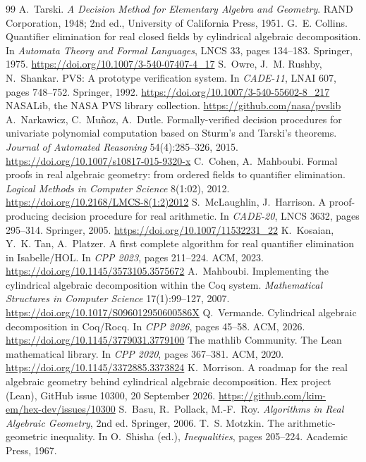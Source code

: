 \documentclass[11pt]{article}
\begin{document}
\begin{thebibliography}{99}\footnotesize
\setlength\itemsep{1pt}
 A.~Tarski. \emph{A Decision Method for Elementary Algebra and Geometry}. RAND Corporation, 1948;
  2nd ed., University of California Press, 1951.
 G.~E. Collins. Quantifier elimination for real closed fields by cylindrical algebraic
  decomposition. In \emph{Automata Theory and Formal Languages}, LNCS 33, pages 134--183. Springer, 1975.
  \url{https://doi.org/10.1007/3-540-07407-4_17}
 S.~Owre, J.~M. Rushby, N.~Shankar. PVS: A prototype verification system. In \emph{CADE-11},
  LNAI 607, pages 748--752. Springer, 1992. \url{https://doi.org/10.1007/3-540-55602-8_217}
 NASALib, the NASA PVS library collection. \url{https://github.com/nasa/pvslib}
 A.~Narkawicz, C.~Mu\~noz, A.~Dutle. Formally-verified decision procedures for univariate
  polynomial computation based on Sturm's and Tarski's theorems. \emph{Journal of Automated Reasoning}
  54(4):285--326, 2015. \url{https://doi.org/10.1007/s10817-015-9320-x}
 C.~Cohen, A.~Mahboubi. Formal proofs in real algebraic geometry: from ordered fields to
  quantifier elimination. \emph{Logical Methods in Computer Science} 8(1:02), 2012. \url{https://doi.org/10.2168/LMCS-8(1:2)2012}
 S.~McLaughlin, J.~Harrison. A proof-producing decision procedure for real arithmetic. In
  \emph{CADE-20}, LNCS 3632, pages 295--314. Springer, 2005. \url{https://doi.org/10.1007/11532231_22}
 K.~Kosaian, Y.~K. Tan, A.~Platzer. A first complete algorithm for real quantifier
  elimination in Isabelle/HOL. In \emph{CPP 2023}, pages 211--224. ACM, 2023. \url{https://doi.org/10.1145/3573105.3575672}
 A.~Mahboubi. Implementing the cylindrical algebraic decomposition within the Coq system.
  \emph{Mathematical Structures in Computer Science} 17(1):99--127, 2007.
  \url{https://doi.org/10.1017/S096012950600586X}
 Q.~Vermande. Cylindrical algebraic decomposition in Coq/Rocq. In \emph{CPP 2026},
  pages 45--58. ACM, 2026. \url{https://doi.org/10.1145/3779031.3779100}
 The mathlib Community. The Lean mathematical library. In \emph{CPP 2020}, pages 367--381. ACM, 2020.
  \url{https://doi.org/10.1145/3372885.3373824}
 K.~Morrison. A roadmap for the real algebraic geometry behind cylindrical algebraic decomposition.
  Hex project (Lean), GitHub issue 10300, 20 September 2026. \url{https://github.com/kim-em/hex-dev/issues/10300}
 S.~Basu, R.~Pollack, M.-F.~Roy. \emph{Algorithms in Real Algebraic Geometry}, 2nd ed.
  Springer, 2006.
 T.~S. Motzkin. The arithmetic-geometric inequality. In O.~Shisha (ed.), \emph{Inequalities},
  pages 205--224. Academic Press, 1967.
\end{thebibliography}
\end{document}
